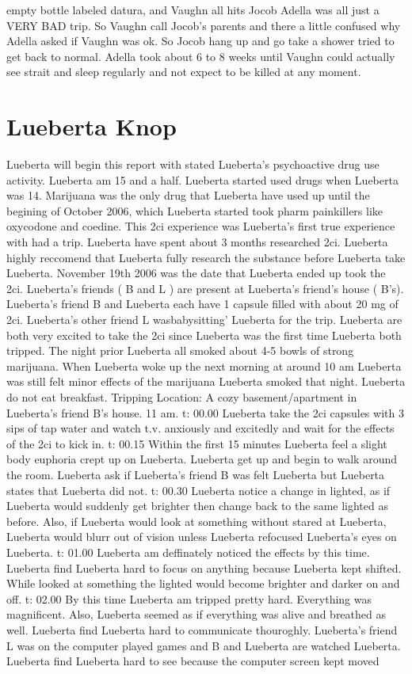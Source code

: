 \documentclass[12pt]{book}
\begin{document}
empty bottle labeled datura, and Vaughn all hits Jocob Adella was all just a VERY BAD trip. So Vaughn call Jocob's parents and there a little confused why Adella asked if Vaughn was ok. So Jocob hang up and go take a shower tried to get back to normal. Adella took about 6 to 8 weeks until Vaughn could actually see strait and sleep regularly and not expect to be killed at any moment.



\chapter{Lueberta Knop}

Lueberta will begin this report with stated Lueberta's psychoactive drug use activity. Lueberta am 15 and a half. Lueberta started used drugs when Lueberta was 14. Marijuana was the only drug that Lueberta have used up until the begining of October 2006, which Lueberta started took pharm painkillers like oxycodone and coedine. This 2ci experience was Lueberta's first true experience with had a trip. Lueberta have spent about 3 months researched 2ci. Lueberta highly reccomend that Lueberta fully research the substance before Lueberta take Lueberta. November 19th 2006 was the date that Lueberta ended up took the 2ci. Lueberta's friends ( B and L ) are present at Lueberta's friend's house ( B's). Lueberta's friend B and Lueberta each have 1 capsule filled with about 20 mg of 2ci. Lueberta's other friend L wasbabysitting' Lueberta for the trip. Lueberta are both very excited to take the 2ci since Lueberta was the first time Lueberta both tripped. The night prior Lueberta all smoked about 4-5 bowls of strong marijuana. When Lueberta woke up the next morning at around 10 am Lueberta was still felt minor effects of the marijuana Lueberta smoked that night. Lueberta do not eat breakfast. Tripping Location: A cozy basement/apartment in Lueberta's friend B's house. 11 am. t: 00.00 Lueberta take the 2ci capsules with 3 sips of tap water and watch t.v. anxiously and excitedly and wait for the effects of the 2ci to kick in. t: 00.15 Within the first 15 minutes Lueberta feel a slight body euphoria crept up on Lueberta. Lueberta get up and begin to walk around the room. Lueberta ask if Lueberta's friend B was felt Lueberta but Lueberta states that Lueberta did not. t: 00.30 Lueberta notice a change in lighted, as if Lueberta would suddenly get brighter then change back to the same lighted as before. Also, if Lueberta would look at something without stared at Lueberta, Lueberta would blurr out of vision unless Lueberta refocused Lueberta's eyes on Lueberta. t: 01.00 Lueberta am deffinately noticed the effects by this time. Lueberta find Lueberta hard to focus on anything because Lueberta kept shifted. While looked at something the lighted would become brighter and darker on and off. t: 02.00 By this time Lueberta am tripped pretty hard. Everything was magnificent. Also, Lueberta seemed as if everything was alive and breathed as well. Lueberta find Lueberta hard to communicate thouroghly. Lueberta's friend L was on the computer played games and B and Lueberta are watched Lueberta. Lueberta find Lueberta hard to see because the computer screen kept moved 
\end{document}
